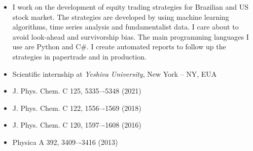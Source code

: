 \documentclass[10pt,a4paper,ragged2e,withhyper]{altacv}
\begin{document}
\begin{paracol}{2}
            \begin{itemize}
                \item I work on the development of equity trading strategies for Brazilian and US stock market. The strategies are developed by using machine learning algorithms, time series analysis and fundamentalist data. I care about to avoid look-ahead and survivorship bias. The main programming languages I use are Python and C\#. I create automated reports to follow up the strategies in papertrade and in production.
            \end{itemize}
                
                
        
            \begin{itemize}
                \item Scientific internship at {\it Yeshiva University}, New York -- NY, EUA
            \end{itemize}
            
            \begin{itemize}
            \end{itemize}
            
        
            \begin{itemize}
                \item J. Phys. Chem. C 125, 5335–-5348 (2021)
                \item J. Phys. Chem. C 122, 1556–-1569 (2018)
                \item J. Phys. Chem. C 120, 1597–-1608 (2016)
                \item Physica A 392, 3409–-3416 ({2013})

            \end{itemize}

    \end{paracol}
\end{document}
